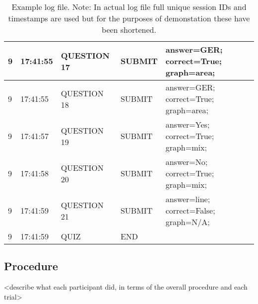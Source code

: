\begin{table}[!ht]
\begin{tabular}{|l|l|l|l|l|}
        9 & 17:41:55 & QUESTION 17 & SUBMIT & answer=GER; correct=True; graph=area; \\ \hline
        9 & 17:41:55 & QUESTION 18 & SUBMIT & answer=GER; correct=True; graph=area; \\ \hline
        9 & 17:41:57 & QUESTION 19 & SUBMIT & answer=Yes; correct=True; graph=mix; \\ \hline
        9 & 17:41:58 & QUESTION 20 & SUBMIT & answer=No; correct=True; graph=mix; \\ \hline
        9 & 17:41:59 & QUESTION 21 & SUBMIT & answer=line; correct=False; graph=N/A; \\ \hline
        9 & 17:41:59 & QUIZ & END & ~ \\ \hline
    \end{tabular}
    \caption{Example log file. Note: In actual log file full unique session IDs and timestamps are used but for the purposes of demonstation these have been shortened.}
\end{table}
\subsection{Procedure}
<describe what each participant did, in terms of the overall procedure and each trial>
